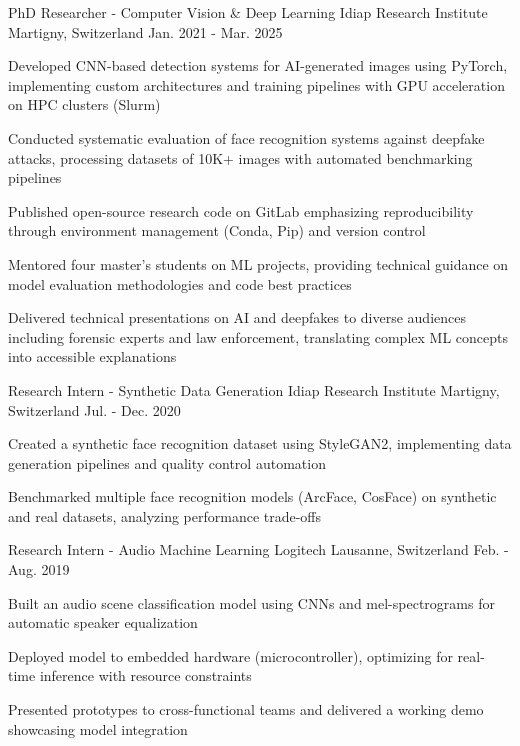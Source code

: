 \begin{cventries}
  \cventry
    {PhD Researcher - Computer Vision \& Deep Learning} %
    {Idiap Research Institute} %
    {Martigny, Switzerland} %
    {Jan. 2021 - Mar. 2025} %
    {
      \begin{cvitems} %
        \item {Developed CNN-based detection systems for AI-generated images using PyTorch, implementing custom architectures and training pipelines with GPU acceleration on HPC clusters (Slurm)}
        \item {Conducted systematic evaluation of face recognition systems against deepfake attacks, processing datasets of 10K+ images with automated benchmarking pipelines}
        \item {Published open-source research code on GitLab emphasizing reproducibility through environment management (Conda, Pip) and version control}
        \item {Mentored four master's students on ML projects, providing technical guidance on model evaluation methodologies and code best practices}
        \item {Delivered technical presentations on AI and deepfakes to diverse audiences including forensic experts and law enforcement, translating complex ML concepts into accessible explanations}
      \end{cvitems}
    }

  \cventry
    {Research Intern - Synthetic Data Generation} %
    {Idiap Research Institute} %
    {Martigny, Switzerland} %
    {Jul. - Dec. 2020} %
    {
      \begin{cvitems} %
        \item {Created a synthetic face recognition dataset using StyleGAN2, implementing data generation pipelines and quality control automation}
        \item {Benchmarked multiple face recognition models (ArcFace, CosFace) on synthetic and real datasets, analyzing performance trade-offs}
      \end{cvitems}
    }

  \cventry
    {Research Intern - Audio Machine Learning} %
    {Logitech} %
    {Lausanne, Switzerland} %
    {Feb. - Aug. 2019} %
    {
      \begin{cvitems} %
        \item {Built an audio scene classification model using CNNs and mel-spectrograms for automatic speaker equalization}
        \item {Deployed model to embedded hardware (microcontroller), optimizing for real-time inference with resource constraints}
        \item {Presented prototypes to cross-functional teams and delivered a working demo showcasing model integration}
      \end{cvitems}
    }

\end{cventries}
